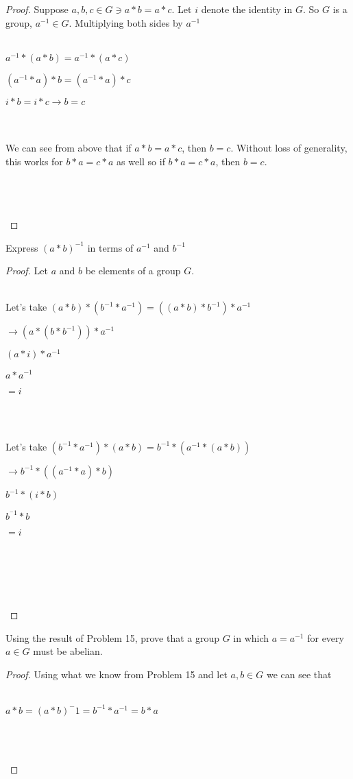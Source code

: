 \documentclass[12pt]{article}
\newenvironment{problem}[2][Problem]{\begin{trivlist}
\item[\hskip \labelsep {\bfseries #1}\hskip \labelsep {\bfseries #2.}]}{\end{trivlist}}
\begin{document}
\begin{proof}
Suppose $a,b,c \in G \ni a*b=a*c$. Let $i$ denote the identity in $G$. So $G$ is a group, $a^{-1} \in G$. Multiplying both sides by $a^{-1}$ \\ \\
\centerline{$a^{-1}*(a*b)=a^{-1}*(a*c)$}
\centerline{$(a^{-1}*a)*b=(a^{-1}*a)*c$}
\centerline{$i*b=i*c \rightarrow b=c$} \\ \\
We can see from above that if $a*b=a*c$, then $b=c$. Without loss of generality, this works for $b*a=c*a$ as well so if $b*a=c*a$, then $b=c$. \\ \\
\centerline{} \\ \\
\end{proof}

\begin{problem}{2.1.15}
Express $(a*b)^{-1}$ in terms of $a^{-1}$ and $b^{-1}$
\end{problem}

\begin{proof}
Let $a$ and $b$ be elements of a group $G$. \\ \\
\centerline{Let's take $(a*b)*(b^{-1}*a^{-1})=((a*b)*b^{-1})*a^{-1}$}
\centerline{$\rightarrow (a*(b*b^{-1}))*a^{-1}$}
\centerline{$(a*i)*a^{-1}$}
\centerline{$a*a^{-1}$}
\centerline{$=i$} \\ \\
\centerline{Let's take $(b^{-1}*a^{-1})*(a*b)=b^{-1}*(a^{-1}*(a*b))$}
\centerline{$\rightarrow b^{-1}*((a^{-1}*a)*b)$}
\centerline{$b^{-1}*(i*b)$}
\centerline{$b^{^-1}*b$}
\centerline{$=i$} \\ \\
\centerline{} \\ \\

\end{proof}

\begin{problem}{2.1.16}
Using the result of Problem 15, prove that a group $G$ in which $a = a^{-1}$ for every $a \in G$ must be abelian.
\end{problem}

\begin{proof}
Using what we know from Problem 15 and let $a,b \in G$ we can see that \\ \\
\centerline{$a*b = (a*b)^-1=b^{-1}*a^{-1}=b*a$} \\ \\
\centerline{}

\end{proof}

 
\end{document}
